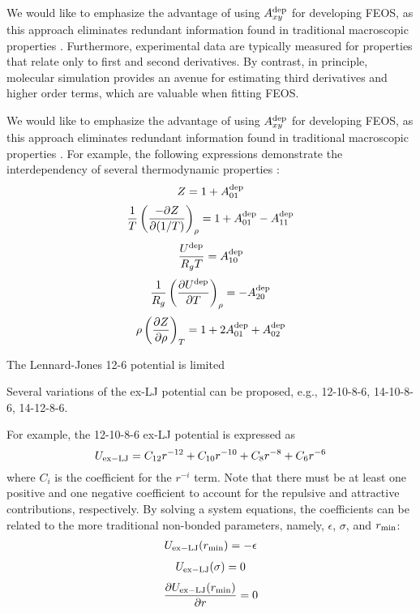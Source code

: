 \documentclass[11pt,a4paper]{article}
\begin{document}
We would like to emphasize the advantage of using $A_{xy}^{\rm dep}$ for developing FEOS, as this approach eliminates redundant information found in traditional macroscopic properties \cite{Thol2016_LJ,Rutkai2017,Lustig2015,Rutkai2013,Rutkai2015}. Furthermore, experimental data are typically measured for properties that relate only to first and second derivatives. By contrast, in principle, molecular simulation provides an avenue for estimating third derivatives and higher order terms, which are valuable when fitting FEOS.
   
We would like to emphasize the advantage of using $A_{xy}^{\rm dep}$ for developing FEOS, as this approach eliminates redundant information found in traditional macroscopic properties \cite{Thol2016_LJ,Rutkai2017,Lustig2015,Rutkai2013,Rutkai2015}. For example, the following expressions demonstrate the interdependency of several thermodynamic properties \cite{Rutkai2015}:
\begin{equation} \label{eq:Z}
Z = 1 + A_{01}^{\rm dep}
\end{equation}
\begin{equation} \label{eq:Z_IC}
\frac{1}{T} \left(\frac{-\partial Z}{\partial(1/T)}\right)_\rho = 1 + A_{01}^{\rm dep} - A_{11}^{\rm dep}
\end{equation}
\begin{equation} \label{eq:U}
\frac{U^{\rm dep}}{R_gT} = A_{10}^{\rm dep}
\end{equation}
\begin{equation} \label{eq:U_IC}
\frac{1}{R_g} \left(\frac{\partial U^{\rm dep}}{\partial T}\right)_\rho = -A_{20}^{\rm dep} 
\end{equation} 
\begin{equation} \label{eq:Z_IT}
\rho \left(\frac{\partial Z}{\partial \rho}\right)_T = 1 + 2 A_{01}^{\rm dep} + A_{02}^{\rm dep} 
\end{equation}

The Lennard-Jones 12-6 potential is limited

Several variations of the ex-LJ potential can be proposed, e.g., 12-10-8-6, 14-10-8-6, 14-12-8-6.

For example, the 12-10-8-6 ex-LJ potential is expressed as 
\begin{equation}
U_{\rm ex-LJ} = C_{12} r^{-12} + C_{10} r^{-10} + C_{8} r^{-8} + C_{6} r^{-6}
\end{equation}
where $C_{i}$ is the coefficient for the $r^{-i}$ term. Note that there must be at least one positive and one negative coefficient to account for the repulsive and attractive contributions, respectively. By solving a system equations, the coefficients can be related to the more traditional non-bonded parameters, namely, $\epsilon$, $\sigma$, and $r_{\rm min}$:
\begin{eqnarray}
U_{\rm ex-LJ}(r_{\rm min}) = -\epsilon
\end{eqnarray}
\begin{eqnarray}
U_{\rm ex-LJ}(\sigma) = 0
\end{eqnarray}
\begin{eqnarray}
\frac{\partial U_{\rm ex-LJ}(r_{\rm min})}{\partial r} = 0
\end{eqnarray}
\end{document}
